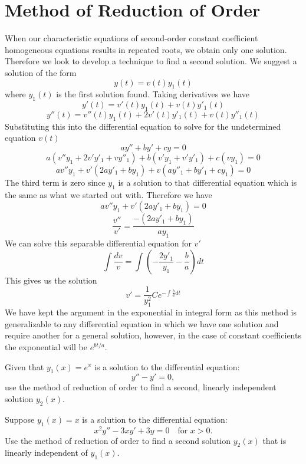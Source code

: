 \section{Method of Reduction of Order}
When our characteristic equations of second-order constant coefficient homogeneous equations results in repeated roots, we obtain only one solution. Therefore we look to develop a technique to find a second solution. We suggest a solution of the form 
\[y(t) = v(t)y_1(t)\]
where $y_1(t)$ is the first solution found. 
Taking derivatives we have
\[y'(t) = v'(t)y_1(t) + v(t)y'_1(t)\]
\[y''(t) = v''(t)y_1(t) + 2v'(t)y'_1(t) + v(t)y''_1(t)\]
Substituting this into the differential equation to solve for the undetermined equation $v(t)$
\[ay''+by'+cy = 0 \]
\[a(v''y_1 + 2v'y'_1 + vy''_1) + b(v'y_1 + v'y'_1) + c(vy_1) = 0 \]
\[av''y_1 + v'(2ay'_1+by_1) + v(ay''_1 + by'_1 + cy_1) = 0\]
The third term is zero since $y_1$ is a solution to that differential equation which is the same as what we started out with. Therefore we have
\[av''y_1 + v'(2ay'_1+by_1)=0\]
\[\frac{v''}{v'} = \frac{-(2ay'_1+by_1)}{ay_1}\]
We can solve this separable differential equation for $v'$
\[\int \frac{dv}{v} = \int (-\frac{2y'_1}{y_1} - \frac{b}{a})dt\]
This gives us the solution
\[v' =\frac{1}{y_1^2}Ce^{-\int \frac{b}{a}dt}\]
We have kept the argument in the exponential in integral form as this method is generalizable to any differential equation in which we have one solution and require another for a general solution, however, in the case of constant coefficients the exponential will be $e^{bt/a}$.
\exercises
\begin{exerciselist}
\item Given that \( y_1(x) = e^x \) is a solution to the differential equation:
\[y'' - y' = 0,\]
use the method of reduction of order to find a second, linearly independent solution \( y_2(x) \).
\item Suppose \( y_1(x) = x \) is a solution to the differential equation:
\[x^2 y'' - 3x y' + 3y = 0 \quad \text{for } x > 0.\]
Use the method of reduction of order to find a second solution \( y_2(x) \) that is linearly independent of \( y_1(x) \).
\end{exerciselist}
